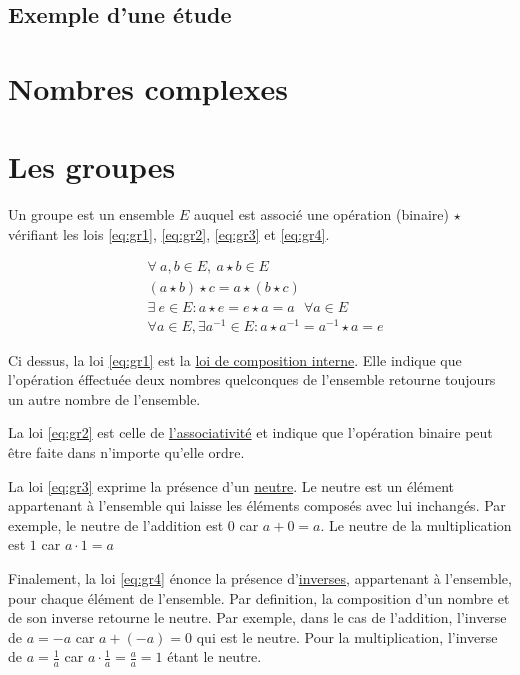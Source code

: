 \documentclass[a4paper]{article}
\begin{document}
    \subsection{Exemple d'une étude}
    \section{Nombres complexes}
    \section{Les groupes} 
    Un groupe est un ensemble $E$ auquel est associé une opération (binaire)
    $\star$ vérifiant les lois \ref{eq:gr1}, \ref{eq:gr2}, \ref{eq:gr3} et
    \ref{eq:gr4}.

    \begin{align}
        &\forall \ a, b \in E, \ a \star b \in E \label{eq:gr1}\\
        &(a \star b) \star c = a \star (b \star c)\label{eq:gr2} \\
        &\exists \ e \in E : a \star e  = e \star a = a \ \ \ \forall a \in E
        \label{eq:gr3}\\
        &\forall a \in E, \exists a^{-1} \in E : a \star a^{-1} = a^{-1} \star a
        = e \label{eq:gr4}
    \end{align}

    Ci dessus, la loi \ref{eq:gr1} est la \underline{loi de composition
    interne}. Elle indique que l'opération éffectuée deux nombres quelconques de
    l'ensemble retourne toujours un autre nombre de l'ensemble. 

    La loi \ref{eq:gr2} est celle de \underline{l'associativité} et indique
    que l'opération binaire peut être faite dans n'importe qu'elle ordre.

    La loi \ref{eq:gr3} exprime la présence d'un \underline{neutre}. Le
    neutre est un élément appartenant à l'ensemble qui laisse les éléments
    composés avec lui inchangés. Par exemple, le neutre de l'addition est $0$
    car $a + 0 = a$. Le neutre de la multiplication est $1$ car $a \cdot 1 = a$

    Finalement, la loi \ref{eq:gr4} énonce la présence d'\underline{inverses},
    appartenant à l'ensemble, pour chaque élément de l'ensemble. Par definition,
    la composition d'un nombre et de son inverse retourne le neutre. Par
    exemple, dans le cas de l'addition, l'inverse de $a = -a$ car $a + (-a) = 0$
    qui est le neutre. Pour la multiplication, l'inverse de $a = \frac{1}{a}$
    car $a \cdot \frac{1}{a} = \frac{a}{a} = 1$ étant le neutre. 
\end{document}
